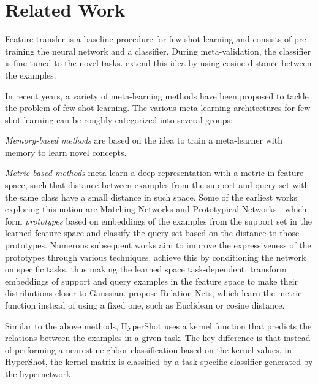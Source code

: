 \documentclass[nohyperref]{article}
\def\our{HyperShot}
\theoremstyle{plain}
\theoremstyle{definition}
\theoremstyle{remark}
\begin{document}
\section{Related Work}

Feature transfer \cite{zhuang2020comprehensive} is a baseline procedure for few-shot learning and consists of pre-training the neural network and a classifier. During meta-validation, the classifier is fine-tuned to the novel tasks. \cite{chen2019closer} extend this idea by using cosine distance between the examples. 

In recent years, a variety of meta-learning methods \cite{hospedales2020metalearning,schmidhuber1992fast,bengio1992optimization} have been proposed to tackle the problem of few-shot learning. The various meta-learning architectures for few-shot learning can be roughly categorized into several groups: 

{\em Memory-based methods} \cite{ravi2016optimization,munkhdalai2018rapid,santoro2016meta,mishra2018simple,munkhdalai2017meta,zhen2020learning} are based on the idea to train a meta-learner with memory to learn novel concepts.



{\em Metric-based methods} meta-learn a deep representation with a metric in feature space, such that distance between examples from the support and query set with the same class have a small distance in such space. Some of the earliest works exploring this notion are Matching Networks \cite{vinyals2016matching} and Prototypical Networks \cite{snell2017prototypical}, which form \textit{prototypes} based on embeddings of the examples from the support set in the learned feature space and classify the query set based on the distance to those prototypes. Numerous subsequent works aim to improve the expressiveness of the prototypes through various techniques. \cite{oreshkin2018tadam} achieve this by conditioning the network on specific tasks, thus making the learned space task-dependent.  \cite{hu2021leveraging} transform embeddings of support and query examples in the feature space to make their distributions closer to Gaussian.
\cite{sung2018learning} propose Relation Nets, which learn the metric function instead of using a fixed one, such as Euclidean or cosine distance. 

Similar to the above methods, \our{} uses a kernel function that predicts the relations between the examples in a given task. The key difference is that instead of performing a nearest-neighbor classification based on the kernel values, in \our{}, the kernel matrix is classified by a task-specific classifier generated by the hypernetwork.
\end{document}

